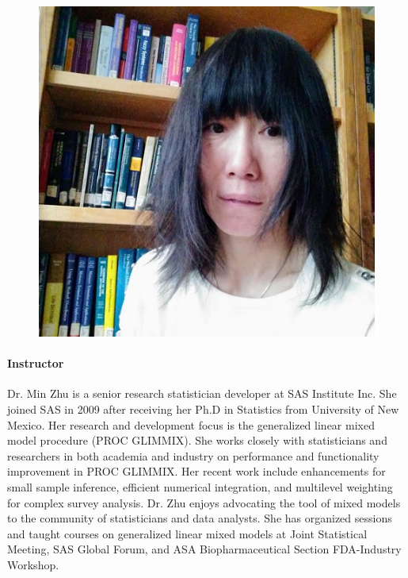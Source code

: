 \documentclass[11pt]{article}
\begin{document}
\begin{figure}
  \vspace{-25pt}
  \begin{center}
    \includegraphics[width=\linewidth]{Zhu-Min.jpg}
  \end{center}
  \vspace{-25pt}
\end{figure}
\paragraph{Instructor}
Dr. Min Zhu is a senior research statistician developer at SAS
Institute Inc. She joined SAS in 2009 after receiving her Ph.D in
Statistics from University of New Mexico. Her research and development
focus is the generalized linear mixed model procedure
(\textsf{PROC GLIMMIX}).
She works closely with statisticians and researchers in both
academia and industry on performance and functionality improvement in
\textsf{PROC GLIMMIX}.
Her recent work include enhancements for small sample
inference, efficient numerical integration, and multilevel weighting
for complex survey analysis. Dr. Zhu enjoys advocating the tool of
mixed models to the community of statisticians and data analysts. She
has organized sessions and taught courses on generalized linear mixed
models at Joint Statistical Meeting, SAS Global Forum, and ASA
Biopharmaceutical Section FDA-Industry Workshop.
\end{document}
